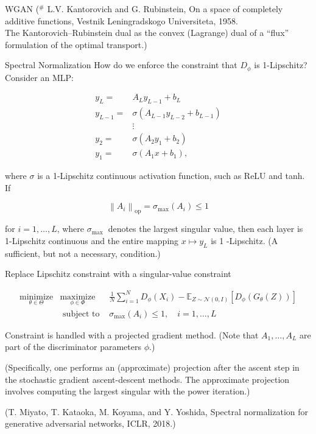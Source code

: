 \begin{frame}[allowframebreaks]
\begin{mydefinitionblock}{21.29}{WGAN}
    ($^{\#}$ L.V. Kantorovich and G. Rubinstein, On a space of completely additive functions, Vestnik Leningradskogo Universiteta, 1958.\\
    The Kantorovich–Rubinstein dual as the convex (Lagrange) dual of a “flux” formulation of the optimal transport.)
\end{mydefinitionblock}

\end{frame}

\begin{frame}[allowframebreaks]

\begin{myconceptblock}{21.30}{Spectral Normalization}
    How do we enforce the constraint that $D_{\phi}$ is 1-Lipschitz? Consider an MLP:

    $$
    \begin{aligned}
    y_{L}= & A_{L} y_{L-1}+b_{L} \\
    y_{L-1}= & \sigma\left(A_{L-1} y_{L-2}+b_{L-1}\right) \\
    & \vdots \\
    y_{2}= & \sigma\left(A_{2} y_{1}+b_{2}\right) \\
    y_{1}= & \sigma\left(A_{1} x+b_{1}\right),
    \end{aligned}
    $$

    where $\sigma$ is a 1-Lipschitz continuous activation function, such as ReLU and tanh. If

    $$
    \left\|A_{i}\right\|_{\mathrm{op}}=\sigma_{\max }\left(A_{i}\right) \leq 1
    $$

    for $i=1, \ldots, L$, where $\sigma_{\text {max }}$ denotes the largest singular value, then each layer is 1-Lipschitz continuous and the entire mapping $x \mapsto y_{L}$ is 1 -Lipschitz. (A sufficient, but not a necessary, condition.)

    Replace Lipschitz constraint with a singular-value constraint

    $$
    \begin{array}{rll}
    \underset{\theta \in \Theta}{\operatorname{minimize}} & \underset{\phi \in \Phi}{\operatorname{maximize}} & \frac{1}{N} \sum_{i=1}^{N} D_{\phi}\left(X_{i}\right)-\mathbb{E}_{Z \sim \mathcal{N}(0, I)}\left[D_{\phi}\left(G_{\theta}(Z)\right)\right] \\
    & \text { subject to } & \sigma_{\max }\left(A_{i}\right) \leq 1, \quad i=1, \ldots, L
    \end{array}
    $$

    Constraint is handled with a projected gradient method. (Note that $A_{1}, \ldots, A_{L}$ are part of the discriminator parameters $\phi$.)

    (Specifically, one performs an (approximate) projection after the ascent step in the stochastic gradient ascent-descent methods. The approximate projection involves computing the largest singular with the power iteration.)

    (T. Miyato, T. Kataoka, M. Koyama, and Y. Yoshida, Spectral normalization for generative adversarial networks, ICLR, 2018.)
\end{myconceptblock}

\end{frame}
